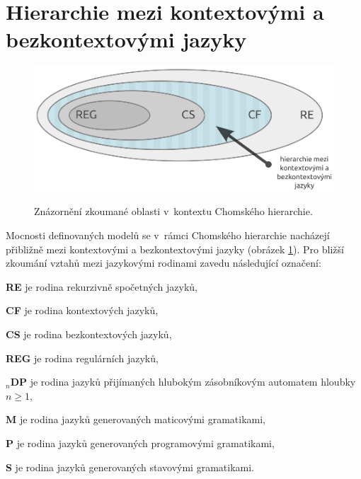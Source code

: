 \section{Hierarchie mezi kontextovými a bezkontextovými jazyky} \label{kap_teorie_hierarchie}


\begin{figure}[ht]
\centering
\includegraphics{img/bp_hierarchy01.eps} \bigskip \\
\caption{Znázornění zkoumané oblasti v~kontextu Chomského hierarchie.}
\label{obr_chom_hierarchy}
\end{figure}

Mocnosti definovaných modelů se v~rámci Chomského hierarchie nacházejí přibližně mezi kontextovými a bezkontextovými jazyky (obrázek \ref{obr_chom_hierarchy}). Pro bližší zkoumání vztahů mezi jazykovými rodinami zavedu následující označení:

\begin{description*}
\item{\textbf{RE}} je rodina rekurzivně spočetných jazyků,
\item{\textbf{CF}} je rodina kontextových jazyků,
\item{\textbf{CS}} je rodina bezkontextových jazyků,
\item{\textbf{REG}} je rodina regulárních jazyků,

\item{\textbf{${}_n$DP}} je rodina jazyků přijímaných hlubokým zásobníkovým automatem hloubky $n \ge 1$,

\item{\textbf{M}} je rodina jazyků generovaných maticovými gramatikami,
\item{\textbf{P}} je rodina jazyků generovaných programovými gramatikami,
\item{\textbf{S}} je rodina jazyků generovaných stavovými gramatikami.

\end{description*}

